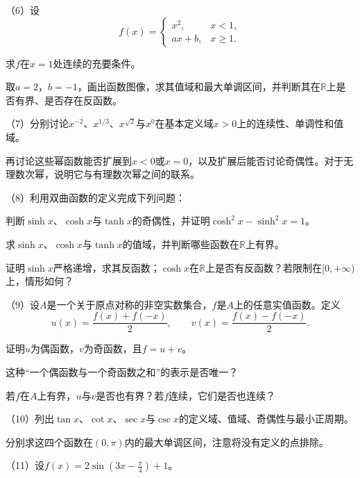 \begin{exercise}
（6）设
\begin{equation*}
    f(x) = \begin{cases}
        x^{2} , & x < 1 , \\
        a x + b , & x \ge 1 .
    \end{cases}
\end{equation*}

\quad {}求\(f\)在\(x = 1\)处连续的充要条件。

\quad {}取\(a = 2\)，\(b = -1\)，画出函数图像，求其值域和最大单调区间，并判断其在\(\mathbb{R}\)上是否有界、是否存在反函数。

（7）分别讨论\(x^{-2}\)、\(x^{1/3}\)、\(x^{\sqrt{2}}\)与\(x^{0}\)在基本定义域\(x > 0\)上的连续性、单调性和值域。

再讨论这些幂函数能否扩展到\(x < 0\)或\(x = 0\)，以及扩展后能否讨论奇偶性。对于无理数次幂，说明它与有理数次幂之间的联系。

（8）利用双曲函数的定义完成下列问题：

\quad {}判断\(\sinh x\)、\(\cosh x\)与\(\tanh x\)的奇偶性，并证明\(\cosh^{2} x - \sinh^{2} x = 1\)。

\quad {}求\(\sinh x\)、\(\cosh x\)与\(\tanh x\)的值域，并判断哪些函数在\(\mathbb{R}\)上有界。

\quad {}证明\(\sinh x\)严格递增，求其反函数；\(\cosh x\)在\(\mathbb{R}\)上是否有反函数？若限制在\([0 , + \infty)\)上，情形如何？

（9）设\(A\)是一个关于原点对称的非空实数集合，\(f\)是\(A\)上的任意实值函数。定义
\begin{equation*}
    u(x) = \frac{f(x) + f(-x)}{2} , \qquad
    v(x) = \frac{f(x) - f(-x)}{2} .
\end{equation*}

\quad {}证明\(u\)为偶函数，\(v\)为奇函数，且\(f = u + v\)。

\quad {}这种“一个偶函数与一个奇函数之和”的表示是否唯一？

\quad {}若\(f\)在\(A\)上有界，\(u\)与\(v\)是否也有界？若\(f\)连续，它们是否也连续？

（10）列出\(\tan x\)、\(\cot x\)、\(\sec x\)与\(\csc x\)的定义域、值域、奇偶性与最小正周期。

分别求这四个函数在\((0 , \pi)\)内的最大单调区间，注意将没有定义的点排除。

（11）设\(f(x) = 2 \sin \left( 3 x - \frac{\pi}{4} \right) + 1\)。


\end{exercise}
